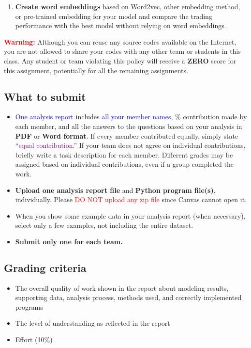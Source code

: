 \documentclass[twocolumn,12pt]{article}
\begin{document}
\begin{flushleft}
\begin{enumerate}
	\item \textbf{Create word embeddings} based on Word2vec, other embedding method, or pre-trained embedding for your model and compare the trading performance with the best model without relying on word embeddings.
\end{enumerate}

\textcolor{red}{\textbf{Warning:}} Although you can reuse any source codes available on the Internet, you are not allowed to share your codes with any other team or students in this class. Any student or team violating this policy will receive a \textbf{ZERO} score for this assignment, potentially for all the remaining assignments.

\subsection*{What to submit}
\begin{itemize}
	\item \textcolor{blue}{One analysis report} includes \textcolor{blue}{all your member names}, \% contribution made by each member, and all the answers to the questions based on your analysis in \textbf{PDF} or \textbf{Word format}. If every member contributed equally, simply state \enquote{\textcolor{purple}{equal contribution}.} If your team does not agree on individual contributions, briefly write a task description for each member. Different grades may be assigned based on individual contributions, even if a group completed the work.
	\item \textbf{Upload one analysis report file} and \textbf{Python program file(s)}, individually. Please \textcolor{red}{DO NOT upload any zip file} since Canvas cannot open it.
	\item When you show some example data in your analysis report (when necessary), select only a few examples, not including the entire dataset.
	\item \textbf{Submit only one for each team.}
\end{itemize}

\subsection*{Grading criteria}
\begin{itemize}
	\item The overall quality of work shown in the report about modeling results, supporting data, analysis process, methods used, and correctly implemented programs
	\item The level of understanding as reflected in the report
	\item Effort (10\%)
\end{itemize}
\fi


\end{flushleft}
\end{document}
